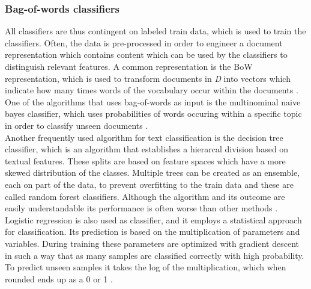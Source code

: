 \subsubsection{Bag-of-words classifiers}
All classifiers are thus contingent on labeled train data, which is used to train the classifiers. Often, the data is pre-processed in order to engineer a document representation which contains content which can be used by the classifiers to distinguish relevant features. A common representation is the BoW representation, which is used to transform documents in \textit{D} into vectors which indicate how many times words of the vocabulary occur within the documents \cite{aggarwal2012survey}.\\
One of the algorithms that uses bag-of-words as input is the multinominal naive bayes classifier, which uses probabilities of words occuring within a specific topic in order to classify unseen documents \cite{aggarwal2012survey}.\\
Another frequently used algorithm for text classification is the decision tree classifier, which is an algorithm that establishes a hierarcal division based on textual features. These splits are based on feature spaces which have a more skewed distribution of the classes. Multiple trees can be created as an ensemble, each on part of the data, to prevent overfitting to the train data and these are called random forest classifiers. Although the algorithm and its outcome are easily understandable its performance is often worse than other methods \cite{li1998classification}.\\
Logistic regression is also used as classifier, and it employs a statistical approach for classification. Its prediction is based on the multiplication of parameters and variables. During training these parameters are optimized with gradient descent in such a way that as many samples are classified correctly with high probability. To predict unseen samples it takes the log of the multiplication, which when rounded ends up as a 0 or 1 \cite{aggarwal2012survey}. \\ 
